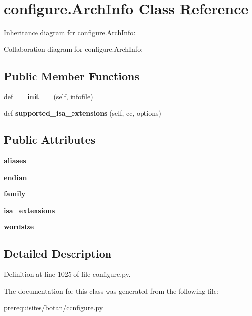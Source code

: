 \hypertarget{classconfigure_1_1_arch_info}{}\section{configure.\+Arch\+Info Class Reference}
\label{classconfigure_1_1_arch_info}


Inheritance diagram for configure.\+Arch\+Info\+:


Collaboration diagram for configure.\+Arch\+Info\+:
\subsection*{Public Member Functions}
\begin{DoxyCompactItemize}
\item 
\mbox{\label{classconfigure_1_1_arch_info_aea6d69d57f3dddb0445dfc24e7cb7af7}} 
def {\bfseries \+\_\+\+\_\+init\+\_\+\+\_\+} (self, infofile)
\item 
\mbox{\label{classconfigure_1_1_arch_info_ac68af23c257676bd02c16bbe01edb159}} 
def {\bfseries supported\+\_\+isa\+\_\+extensions} (self, cc, options)
\end{DoxyCompactItemize}
\subsection*{Public Attributes}
\begin{DoxyCompactItemize}
\item 
\mbox{\label{classconfigure_1_1_arch_info_ac1da306dd49e95939a03d7cdc1ceee9c}} 
{\bfseries aliases}
\item 
\mbox{\label{classconfigure_1_1_arch_info_a9ba8a31c9e9309781b52b1598eef3455}} 
{\bfseries endian}
\item 
\mbox{\label{classconfigure_1_1_arch_info_a7bda9e595400c5e44cd2fc9b51faa296}} 
{\bfseries family}
\item 
\mbox{\label{classconfigure_1_1_arch_info_a8d5f74d8b4d17338ab3116d0cd8641cd}} 
{\bfseries isa\+\_\+extensions}
\item 
\mbox{\label{classconfigure_1_1_arch_info_aa53afbf8e65163ed13803cb0b6d33eae}} 
{\bfseries wordsize}
\end{DoxyCompactItemize}


\subsection{Detailed Description}


Definition at line 1025 of file configure.\+py.



The documentation for this class was generated from the following file\+:\begin{DoxyCompactItemize}
\item 
prerequisites/botan/configure.\+py\end{DoxyCompactItemize}
